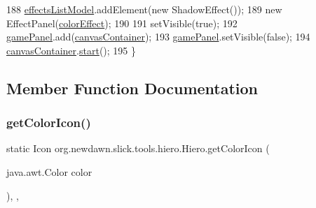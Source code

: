 \begin{DoxyCode}
188         \mbox{\hyperlink{classorg_1_1newdawn_1_1slick_1_1tools_1_1hiero_1_1_hiero_ace6d63639e4675334744afbdad439e98}{effectsListModel}}.addElement(\textcolor{keyword}{new} ShadowEffect());
189         \textcolor{keyword}{new} EffectPanel(\mbox{\hyperlink{classorg_1_1newdawn_1_1slick_1_1tools_1_1hiero_1_1_hiero_ac8bd87c081b8bcc14e2646e883a89e44}{colorEffect}});
190 
191         setVisible(\textcolor{keyword}{true});
192         \mbox{\hyperlink{classorg_1_1newdawn_1_1slick_1_1tools_1_1hiero_1_1_hiero_a2ce748cacd6def18f0e72fc5a139518c}{gamePanel}}.add(\mbox{\hyperlink{classorg_1_1newdawn_1_1slick_1_1tools_1_1hiero_1_1_hiero_a4c424782a802cfd90d1304f55c405c58}{canvasContainer}});
193         \mbox{\hyperlink{classorg_1_1newdawn_1_1slick_1_1tools_1_1hiero_1_1_hiero_a2ce748cacd6def18f0e72fc5a139518c}{gamePanel}}.setVisible(\textcolor{keyword}{false});
194         \mbox{\hyperlink{classorg_1_1newdawn_1_1slick_1_1tools_1_1hiero_1_1_hiero_a4c424782a802cfd90d1304f55c405c58}{canvasContainer}}.\mbox{\hyperlink{classorg_1_1newdawn_1_1slick_1_1_canvas_game_container_a4649e692eacd83dfb7fe5cf2c383dd39}{start}}();
195     \}
\end{DoxyCode}


\subsection{Member Function Documentation}
\mbox{\label{classorg_1_1newdawn_1_1slick_1_1tools_1_1hiero_1_1_hiero_a965ca93fb655336c8320938445d75ece}} 
\subsubsection{\texorpdfstring{get\+Color\+Icon()}{getColorIcon()}}
{\footnotesize\ttfamily static Icon org.\+newdawn.\+slick.\+tools.\+hiero.\+Hiero.\+get\+Color\+Icon (\begin{DoxyParamCaption}\item[{java.\+awt.\+Color}]{color }\end{DoxyParamCaption})\hspace{0.3cm}{\ttfamily [inline]}, {\ttfamily [static]}, {\ttfamily [package]}}


